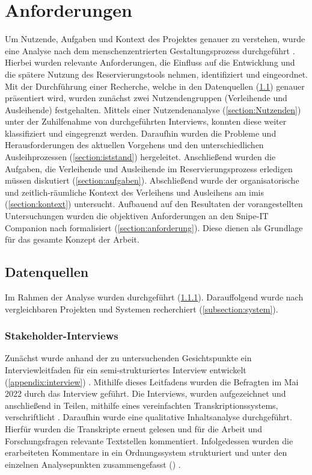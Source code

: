 \chapter{Anforderungen}
\label{chapter-analyse}

Um Nutzende, Aufgaben und Kontext des Projektes genauer zu verstehen, wurde eine Analyse nach dem
menschenzentrierten Gestaltungsprozess durchgeführt \cite{DINISO9241}. Hierbei wurden relevante
Anforderungen, die Einfluss auf die Entwicklung und die spätere Nutzung des Reservierungstools
nehmen, identifiziert und eingeordnet. Mit der Durchführung einer Recherche, welche in den
Datenquellen (\ref{section:daten}) genauer präsentiert wird, wurden zunächst zwei Nutzendengruppen
(Verleihende und Ausleihende) festgehalten. Mittels einer Nutzendenanalyse (\ref{section:Nutzenden})
unter der Zuhilfenahme von durchgeführten Interviews, konnten diese weiter klassifiziert und
eingegrenzt werden. Daraufhin wurden die Probleme und Herausforderungen des aktuellen Vorgehens und
den unterschiedlichen Ausleihprozessen (\ref{section:iststand}) hergeleitet. Anschließend wurden die
Aufgaben, die Verleihende und Ausleihende im Reservierungsprozess erledigen müssen diskutiert
(\ref{section:aufgaben}). Abschließend wurde der organisatorische und zeitlich-räumliche Kontext des
Verleihens und Ausleihens am \ac{imis} (\ref{section:kontext}) untersucht. Aufbauend auf den
Resultaten der vorangestellten Untersuchungen wurden die objektiven Anforderungen an den Snipe-IT
Companion nach  formalisiert (\ref{section:anforderung}). Diese dienen als
Grundlage für das gesamte Konzept der Arbeit.

\section{Datenquellen}
\label{section:daten}
Im Rahmen der Analyse wurden  durchgeführt
(\ref{subsection:interview}). Darauffolgend wurde nach vergleichbaren Projekten und Systemen
recherchiert (\ref{subsection:system}).

\subsection{Stakeholder-Interviews}
\label{subsection:interview}
Zunächst wurde anhand der zu untersuchenden Gesichtspunkte ein Interviewleitfaden für ein
semi-strukturiertes Interview entwickelt (\ref{appendix:interview})
\cite{blandford_qualitative_2016}. Mithilfe dieses Leitfadens wurden die Befragten im Mai 2022 durch
das Interview geführt. Die Interviews, wurden aufgezeichnet und anschließend in Teilen, mithilfe
eines vereinfachten Transkriptionssystems, verschriftlicht \cite{dresing_praxisbuch_2016}. Daraufhin
wurde eine qualitative Inhaltsanalyse durchgeführt. Hierfür wurden die Transkripte erneut gelesen
und für die Arbeit und Forschungsfragen relevante Textstellen kommentiert. Infolgedessen wurden die
erarbeiteten Kommentare in ein Ordnungssystem strukturiert und unter den einzelnen Analysepunkten
zusammengefasst (\label{appendix:digitaleMedien}) \cite{dresing_praxisbuch_2016}.

